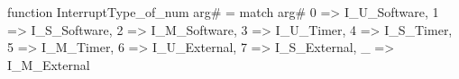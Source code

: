function InterruptType_of_num arg# = match arg# {
  0 => I_U_Software,
  1 => I_S_Software,
  2 => I_M_Software,
  3 => I_U_Timer,
  4 => I_S_Timer,
  5 => I_M_Timer,
  6 => I_U_External,
  7 => I_S_External,
  _ => I_M_External
}
